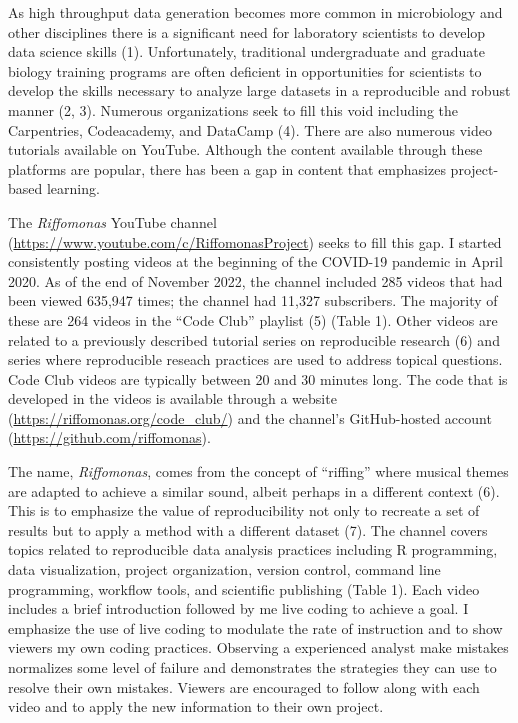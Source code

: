 \documentclass[
]{article}
\begin{document}
As high throughput data generation becomes more common in microbiology
and other disciplines there is a significant need for laboratory
scientists to develop data science skills (1). Unfortunately,
traditional undergraduate and graduate biology training programs are
often deficient in opportunities for scientists to develop the skills
necessary to analyze large datasets in a reproducible and robust manner
(2, 3). Numerous organizations seek to fill this void including the
Carpentries, Codeacademy, and DataCamp (4). There are also numerous
video tutorials available on YouTube. Although the content available
through these platforms are popular, there has been a gap in content
that emphasizes project-based learning.

The \emph{Riffomonas} YouTube channel
(\url{https://www.youtube.com/c/RiffomonasProject}) seeks to fill this
gap. I started consistently posting videos at the beginning of the
COVID-19 pandemic in April 2020. As of the end of November 2022, the
channel included 285 videos that had been viewed 635,947 times; the
channel had 11,327 subscribers. The majority of these are 264 videos in
the ``Code Club'' playlist (5) (Table 1). Other videos are related to a
previously described tutorial series on reproducible research (6) and
series where reproducible reseach practices are used to address topical
questions. Code Club videos are typically between 20 and 30 minutes
long. The code that is developed in the videos is available through a
website (\url{https://riffomonas.org/code_club/}) and the channel's
GitHub-hosted account (\url{https://github.com/riffomonas}).

The name, \emph{Riffomonas}, comes from the concept of ``riffing'' where
musical themes are adapted to achieve a similar sound, albeit perhaps in
a different context (6). This is to emphasize the value of
reproducibility not only to recreate a set of results but to apply a
method with a different dataset (7). The channel covers topics related
to reproducible data analysis practices including R programming, data
visualization, project organization, version control, command line
programming, workflow tools, and scientific publishing (Table 1). Each
video includes a brief introduction followed by me live coding to
achieve a goal. I emphasize the use of live coding to modulate the rate
of instruction and to show viewers my own coding practices. Observing a
experienced analyst make mistakes normalizes some level of failure and
demonstrates the strategies they can use to resolve their own mistakes.
Viewers are encouraged to follow along with each video and to apply the
new information to their own project.
\end{document}
